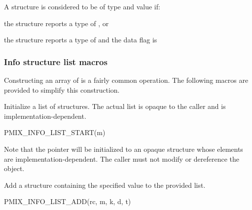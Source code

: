 
\begin{arglist}
\end{arglist}

A  structure is considered to be of type  and value  if:

\begin{compactitemize}
    \item the structure reports a type of , or
    \item the structure reports a type of  and the data flag is 
\end{compactitemize}

\subsubsection{Info structure list macros}
Constructing an array of  is a fairly common operation. The following macros are provided to simplify this construction.


Initialize a list of  structures. The actual list is opaque to the caller and is implementation-dependent.

\cspecificstart
\begin{codepar}
PMIX_INFO_LIST_START(m)
\end{codepar}
\cspecificend

\begin{arglist}
\end{arglist}

Note that the pointer will be initialized to an opaque structure whose elements are implementation-dependent. The caller must not modify or dereference the object.


Add a  structure containing the specified value to the provided list.

\cspecificstart
\begin{codepar}
PMIX_INFO_LIST_ADD(rc, m, k, d, t)
\end{codepar}
\cspecificend

